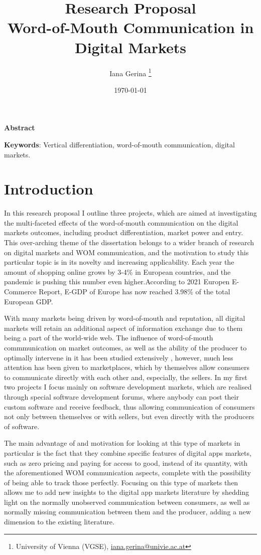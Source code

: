 \documentclass{article}
\title{\textbf{Research Proposal} \\ Word-of-Mouth Communication in Digital Markets}
\author{Iana Gerina \footnote{University of Vienna (VGSE),  \href{mailto:iana.gerina@univie.ac.at}{iana.gerina@univie.ac.at}}}
\date{\today}
\numberwithin{figure}{section}
\numberwithin{table}{section}
\theoremstyle{indented}
\numberwithin{equation}{section} %
\begin{document}
\maketitle
\thispagestyle{empty}

\begin{center}
    \textbf{Abstract}
\end{center}


\vspace{6ex}
\textbf{Keywords}: Vertical differentiation, word-of-mouth communication, digital markets. 


\clearpage
\section{Introduction} \label{motivation}

In this research proposal I outline three projects, which are aimed at investigating the multi-faceted effects of the word-of-mouth communication on the digital markets outcomes, including product differentiation, market power and entry. This over-arching theme of the dissertation belongs to a wider branch of research on digital markets and WOM communication, and the motivation to study this particular topic is in its novelty and increasing applicability. Each year the amount of shopping online grows by 3-4\% in European countries, and the pandemic is pushing this number even higher.According to 2021 Europen E-Commerce Report, E-GDP of Europe has now reached 3.98\% of the total European GDP.  

With many markets being driven by word-of-mouth and reputation, all digital markets will retain an additional aspect of information exchange due to them being a part of the world-wide web. The influence of word-of-mouth commmunication on market outcomes, as well as the ability of the producer to optimally intervene in it has been studied extensively \citep{Mayzlin2006, Godes2009}, however, much less attention has been given to marketplaces, which by themselves allow consumers to communicate directly with each other \citep{Godes2004} and, especially, the sellers. In my first two projects I focus mainly on software development markets, which are realised through special software development forums, where anybody can post their custom software and receive feedback, thus allowing communication of consumers not only between themselves or with sellers, but even directly with the producers of software. 

The main advantage of and motivation for looking at this type of markets in particular is the fact that they combine specific features of digital apps markets, such as zero pricing and paying for access to good, instead of its quantity, with the aforementioned WOM communication aspects, complete with the possibility of being able to track those perfectly. Focusing on this type of markets then allows me to add new insights to the digital app markets literature by shedding light on the normally unobserved communication between consumers, as well as normally missing communication between them and the producer, adding a new dimension to the existing literature.
\end{document}

